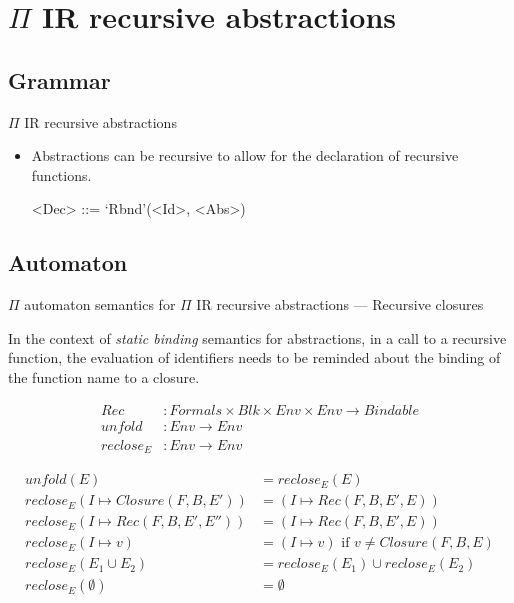 \documentclass{beamer}
\begin{document}
\section{$\Pi$ IR recursive abstractions}

\subsection{Grammar}


\begin{frame}{{\color{red}$\Pi$ IR} recursive abstractions}

\begin{itemize}

\item Abstractions can be recursive to allow for the declaration of recursive functions.

\begin{grammar}
<Dec>       ::= `Rbnd'(<Id>, <Abs>) 
\end{grammar}
\end{itemize}

\end{frame}

\subsection{Automaton}


\begin{frame}{{\color{red}$\Pi$ automaton} semantics for {\color{red}$\Pi$ IR} recursive abstractions --- Recursive closures}

In the context of \emph{static binding} semantics for abstractions, in a call to a recursive function, the evaluation of identifiers needs to be reminded about the binding of the function name to a closure.  

\begin{align*}
\mathit{Rec} &: \mathit{Formals} \times \mathit{Blk} \times \mathit{Env}  \times \mathit{Env} \to \mathit{Bindable} \\
\mathit{unfold} &: \mathit{Env} \to \mathit{Env} \\
\mathit{reclose}_E &: \mathit{Env} \to \mathit{Env} 
\end{align*}

\begin{align}
unfold(E) &= reclose_E(E) \\ 
reclose_E(I \mapsto Closure(F, B, E')) &= (I \mapsto Rec(F, B, E', E)) \\ 
reclose_E(I \mapsto Rec(F, B, E',E'')) & = (I\mapsto Rec(F, B, E', E)) \\ 
reclose_E(I\mapsto v) & = (I\mapsto v) \text{ if } v \not= Closure(F, B, E) \\
reclose_E(E_1\cup E_2) & = reclose_E(E_1) \cup reclose_E(E_2) \\ 
reclose_E(\emptyset) & = \emptyset
\end{align}

\end{frame}
\end{document}
